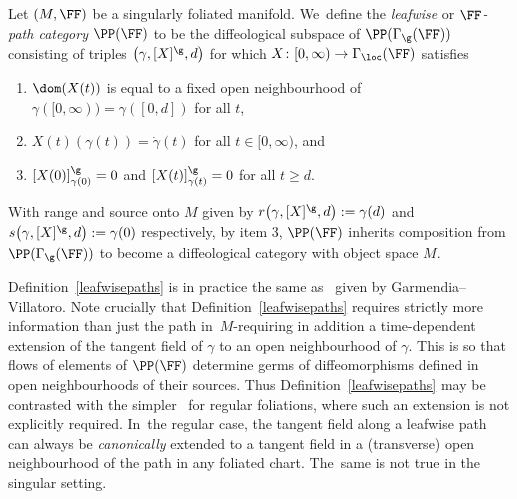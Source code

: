 \begin{Definition}\label{leafwisepaths}
Let $(M,\FF)$ be a singularly foliated manifold. We~define the \textit{leafwise} or \textit{$\FF$-path category} $\PP(\FF)$ to be the diffeological subspace of $\PP(\Gamma_{\g}(\FF))$ consisting of triples $\big(\gamma,[X]^{\g},d\big)$ for which $X\colon [0,\infty)\rightarrow\Gamma_{\loc}(\FF)$ satisfies
\begin{enumerate}\itemsep=0pt
\item[(1)] $\dom(X(t))$ is equal to a fixed open neighbourhood of $\gamma([0,\infty)) = \gamma([0,d])$ for all $t$,
\item[(2)] $X(t)(\gamma(t)) = \dot{\gamma}(t)$ for all $t\in[0,\infty)$, and
\item[(3)] $[X(0)]^{\g}_{\gamma(0)} = 0$ and $[X(t)]^{\g}_{\gamma(t)} = 0$ for all $t\geq d$.
\end{enumerate}
With range and source onto $M$ given by $r\big(\gamma,[X]^{\g},d\big):=\gamma(d)$ and $s\big(\gamma,[X]^{\g},d\big):=\gamma(0)$ respectively, by item 3, $\PP(\FF)$ inherits composition from $\PP(\Gamma_{\g}(\FF))$ to become a diffeological category with object space $M$.
\end{Definition}

Definition~\ref{leafwisepaths} is in practice the same as~\cite[Definition~3.1]{VilGar1} given by Garmendia--Villatoro. Note crucially that Definition~\ref{leafwisepaths} requires strictly more information than just the path in~$M$-re\-quiring in addition a time-dependent extension of the tangent field of $\gamma$ to an open neighbourhood of $\gamma$. This is so that flows of elements of $\PP(\FF)$ determine germs of diffeomorphisms defined in open neighbourhoods of their sources. Thus Definition~\ref{leafwisepaths} may be contrasted with the simpler~\cite[Definition~3.23]{mac3} for regular foliations, where such an extension is not explicitly required. In~the regular case, the tangent field along a leafwise path can always be \textit{canonically} extended to a tangent field in a (transverse) open neighbourhood of the path in any foliated chart. The~same is not true in the singular setting.
